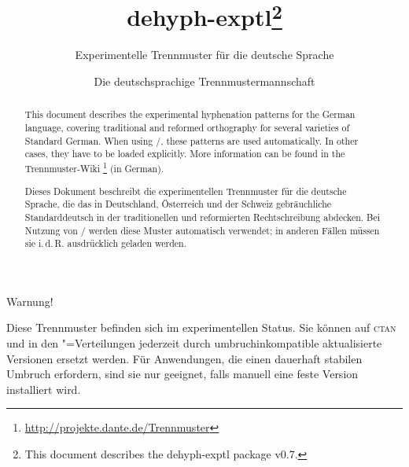 \documentclass[11pt,
               DIV=9,
               toc=flat,
               captions=tableheading,
               abstract=on]{scrartcl}
\newcommand*{\Abk}[1]{\mbox{\textsc{\lsstyle#1}}}
\newcommand*{\Paket}[1]{\textsf{#1}}
\begin{document}


\author{Die deutschsprachige Trennmustermannschaft}
\title{\Paket{dehyph-exptl}\thanks{This document describes the
    \Paket{dehyph-exptl} package v0.7.}}
\subtitle{Experimentelle Trennmuster für die deutsche Sprache}
\maketitle

\begin{abstract}
  This document describes the experimental hyphenation patterns for
  the German language, covering traditional and reformed orthography
  for several varieties of Standard German.  When using
  /, these patterns are used
  automatically.  In other cases, they have to be loaded explicitly.
  More information can be found in the Trennmuster-Wiki%
  \footnote{\url{http://projekte.dante.de/Trennmuster}} (in German).
\end{abstract}

\begin{abstract}
  Dieses Dokument beschreibt die experimentellen Trennmuster für die
  deutsche Sprache, die das in Deutschland, Österreich und der Schweiz
  gebräuchliche Standarddeutsch in der traditionellen und reformierten
  Rechtschreibung abdecken.  Bei Nutzung von
  / werden diese Muster automatisch
  verwendet; in anderen Fällen müssen sie i.\,d.\,R. ausdrücklich
  geladen werden.
\end{abstract}

\vfill
\begingroup
\em\large

\begin{center}
  Warnung!
\end{center}

Diese Trennmuster befinden sich im experimentellen Status.  Sie können
auf \Abk{ctan} und in den "=Verteilungen jederzeit
durch umbruchinkompatible aktualisierte Versionen ersetzt werden.  Für
Anwendungen, die einen dauerhaft stabilen Umbruch erfordern, sind sie
nur geeignet, falls manuell eine feste Version installiert wird.
\endgroup \vfill
\end{document}

